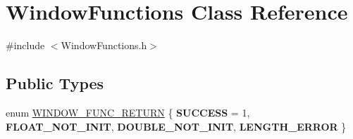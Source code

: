 \hypertarget{class_window_functions}{}\section{Window\+Functions Class Reference}
\label{class_window_functions}


{\ttfamily \#include $<$Window\+Functions.\+h$>$}

\subsection*{Public Types}
\begin{DoxyCompactItemize}
\item 
enum \hyperlink{class_window_functions_a0307e2e5d044d1f81410766ac035fd3f}{W\+I\+N\+D\+O\+W\+\_\+\+F\+U\+N\+C\+\_\+\+R\+E\+T\+U\+RN} \{ {\bfseries S\+U\+C\+C\+E\+SS} = 1, 
{\bfseries F\+L\+O\+A\+T\+\_\+\+N\+O\+T\+\_\+\+I\+N\+IT}, 
{\bfseries D\+O\+U\+B\+L\+E\+\_\+\+N\+O\+T\+\_\+\+I\+N\+IT}, 
{\bfseries L\+E\+N\+G\+T\+H\+\_\+\+E\+R\+R\+OR}
 \}
\end{DoxyCompactItemize}
